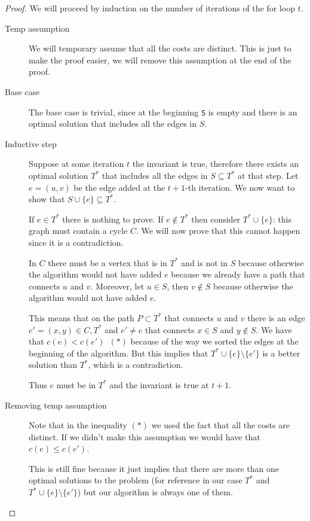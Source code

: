 \documentclass[12pt]{extarticle}
\begin{document}
\begin{proof}
    We will proceed by induction on the number of iterations of the for loop $t$.


    \begin{description}
        \item[Temp assumption]
              We will temporary assume that all the costs are distinct.
              This is just to make the proof easier, we will remove this assumption at the end of the proof.
        \item[Base case]
              The base case is trivial, since at the beginning \texttt{S} is empty and there is an optimal solution that includes all the edges in $S$.
        \item[Inductive step]
              Suppose at some iteration $t$ the invariant is true, therefore there exists an optimal solution $T^*$ that includes all the edges in $S \subseteq T^*$ at that step. Let $e = (u, v)$ be the edge added at the $t+1$-th iteration.
              We now want to show that $S \cup \{e\} \subseteq T^*$.

              If $e \in T^*$ there is nothing to prove.
              If $e \notin T^*$ then consider $T^* \cup \{e\}$: this graph must contain a cycle $C$.
              We will now prove that this cannot happen since it is a contradiction.

              In $C$ there must be a vertex that is in $T^*$ and is not in $S$ because otherwise the algorithm would not have added $e$ because we already have a path that connects $u$ and $v$.
              Moreover, let $u \in S$, then $v \notin S$ because otherwise the algorithm would not have added $e$.

              This means that on the path $P \subset T^*$ that connects $u$ and $v$ there is an edge $e' = (x,y) \in C, T^*$ and $e' \neq e$ that connects $x \in S$ and $y \notin S$.
              We have that $c(e) < c(e') \enspace (*)$ because of the way we sorted the edges at the beginning of the algorithm.
              But this implies that $T^* \cup \{e\} \setminus \{e'\}$ is a better solution than $T^*$, which is a contradiction.

              Thus $e$ must be in $T^*$ and the invariant is true at $t+1$.
        \item[Removing temp assumption]
              Note that in the inequality $(*)$ we used the fact that all the costs are distinct.
              If we didn't make this assumption we would have that $c(e) \leq c(e')$.

              This is still fine because it just implies that there are more than one optimal solutions to the problem (for reference in our case $T^*$ and $T^* \cup \{e\} \setminus \{e'\}$) but our algorithm is always one of them.
    \end{description}
\end{proof}
\end{document}
